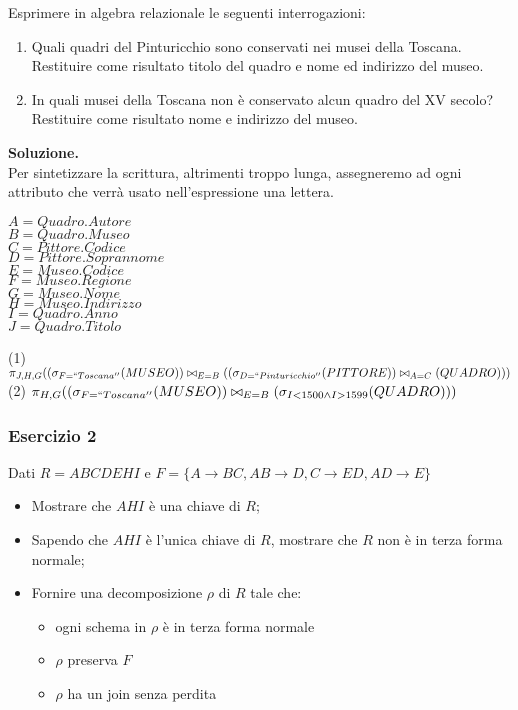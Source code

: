  Esprimere in algebra relazionale le seguenti interrogazioni:
  \begin{enumerate}
   \item Quali quadri del Pinturicchio sono conservati nei musei della Toscana. Restituire come risultato titolo del quadro e 
   nome ed indirizzo del museo.
   \item In quali musei della Toscana non è conservato alcun quadro del XV secolo? Restituire come risultato nome e indirizzo del museo.   
  \end{enumerate}
  \noindent\textbf{\fontsize{14pt}{1em}Soluzione.}\\
  Per sintetizzare la scrittura, altrimenti troppo lunga, assegneremo ad ogni attributo che verrà usato
  nell'espressione una lettera.
  
  \begin{multicols}{3}
  \begin{flushleft}
   $A =Quadro.Autore$\\
   $B = Quadro.Museo$\\
   $C = Pittore.Codice$\\
   $D = Pittore.Soprannome$\\
   $E = Museo.Codice$\\
   $F = Museo.Regione$\\
   $G = Museo.Nome$\\
   $H = Museo.Indirizzo$\\
   $I = Quadro.Anno$\\
   $J = Quadro.Titolo$\\
  \end{flushleft}
  \end{multicols}

 \noindent(1) $\pi_{J, H, G}((\sigma_{F=``Toscana''}(MUSEO))\bowtie_{E=B}((\sigma_{D=``Pinturicchio''}(PITTORE))\bowtie_{A=C}(QUADRO)))$\\
 (2) $\pi_{H, G}((\sigma_{F=``Toscana''}(MUSEO))\bowtie_{E=B}(\sigma_{I < 1500 \wedge I > 1599}(QUADRO)))$\\

  \subsubsection{Esercizio 2}
 Dati $R=ABCDEHI$ e $F=\{A\rightarrow BC, AB\rightarrow D, C\rightarrow ED, AD\rightarrow E\}$
 \begin{itemize}
  \item Mostrare che $AHI$ è una chiave di $R$;
  \item Sapendo che $AHI$ è l'unica  chiave di $R$, mostrare che $R$ non è in terza forma normale;
  \item Fornire una decomposizione $\rho$ di $R$ tale che:
   \begin{itemize}   
     \item ogni schema in $\rho$ è in terza forma normale
    \item $\rho$ preserva $F$
    \item $\rho$ ha un join senza perdita
    \end{itemize}
 \end{itemize}
 
